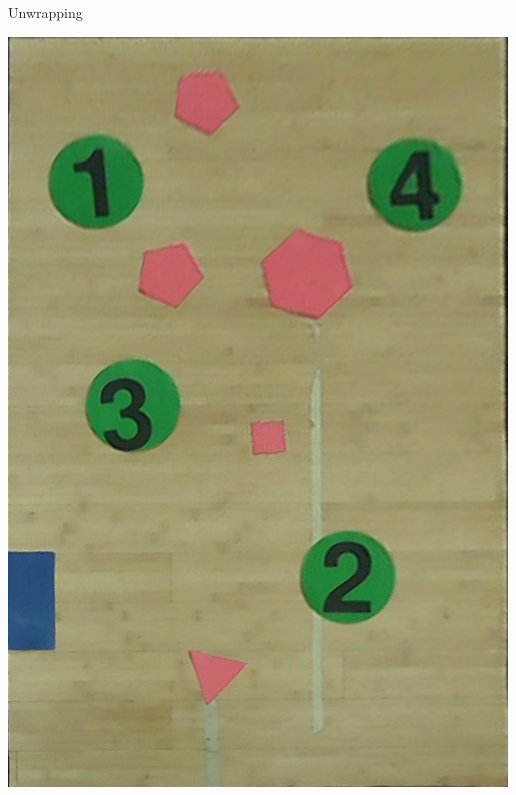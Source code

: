 \begin{frame}{Unwrapping}
	\begin{center}
		\includegraphics[scale=0.25]{Immagini/Unwrapped.jpg}
	\end{center}
\end{frame}

